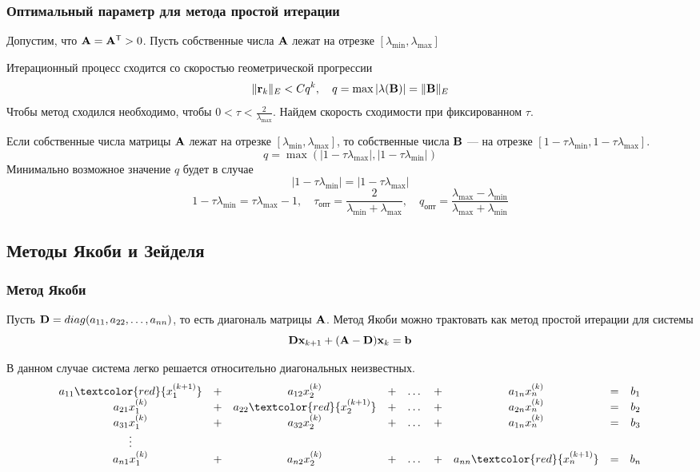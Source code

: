 \documentclass[apectratio=43,unicode]{beamer}
\begin{document}
\begin{frame}\frametitle{Оптимальный параметр для метода простой итерации}
	Допустим, что $\mathbf{A} = \mathbf{A}^{\mathsf{T}} > 0$. Пусть собственные числа $\mathbf{A}$ лежат на
отрезке $[\lambda_{\min}, \lambda_{\max}]$
	\pause

	Итерационный процесс сходится со скоростью геометрической прогрессии
	\[
	\|\mathbf{r}_k\|_E < Cq^k,\quad q = \max |\lambda(\mathbf{B})| = \|\mathbf{B}\|_E
	\]
	\pause
	Чтобы метод сходился необходимо, чтобы $0 < \tau < \frac{2}{\lambda_{\max}}$. Найдем скорость сходимости при фиксированном $\tau$.

	\pause
	Если собственные числа матрицы $\mathbf{A}$ лежат на отрезке $[\lambda_{\min},
\lambda_{\max}]$,
то собственные числа $\mathbf{B}$ --- на отрезке $[1-\tau \lambda_{\min}, 1-\tau
\lambda_{\max}]$.
	\[
	q = \max(|1-\tau \lambda_{\max}|, |1-\tau \lambda_{\min}|)
	\]
	Минимально возможное значение $q$ будет в случае
	\[|1-\tau \lambda_{\min}| = |1-\tau \lambda_{\max}|\]
	\[
	1 - \tau \lambda_{\min} = \tau \lambda_{\max} - 1, \quad \tau_\text{опт} =
\frac{2}{\lambda_{\min}+\lambda_{\max}}, \quad q_\text{опт} =
\frac{\lambda_{\max}-\lambda_{\min}}{\lambda_{\max}+\lambda_{\min}}
	\]
\end{frame}

\subsection{Методы Якоби и Зейделя}
\begin{frame}\frametitle{Метод Якоби}
	Пусть $\mathbf{D} = \mathop{diag}(a_{11}, a_{22}, \dots, a_{nn})$, то есть диагональ матрицы $\mathbf{A}$. 
	Метод Якоби можно трактовать как метод простой итерации для системы
	$$
	\mathbf{D} \mathbf{x}_{k+1} + (\mathbf{A}-\mathbf{D}) \mathbf{x}_k = \mathbf{b}
	$$

	В данном случае система легко решается относительно диагональных
неизвестных.
	\begin{equation*}
	\begin{array}{ccccccccc}
	a_{11} \textcolor{red}{x^{(k+1)}_{1}} &+& a_{12} x^{(k)}_{2}  &+& \dots &+& a_{1n} x^{(k)}_{n} &=& b_1\\
	a_{21} x^{(k)}_{1} &+& a_{22} \textcolor{red}{x^{(k+1)}_{2}} &+& \dots &+& a_{2n} x^{(k)}_{n} &=& b_2\\
	a_{31} x^{(k)}_{1} &+& a_{32} x^{(k)}_{2} &+& \dots &+& a_{1n} x^{(k)}_{n} &=& b_3\\
	\vdots\\
	a_{n1} x^{(k)}_{1} &+& a_{n2} x^{(k)}_{2} &+& \dots &+& a_{nn}
\textcolor{red}{x^{(k+1)}_{n}} &=& b_n
	\end{array}
	\end{equation*}
\end{frame}
\end{document}
